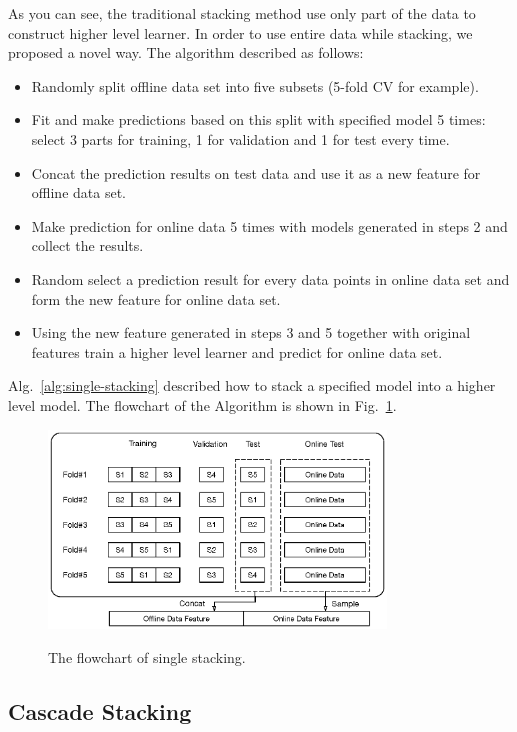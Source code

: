 \documentclass[12pt]{article}
\begin{document}
As you can see, the traditional stacking method use only part of the data to construct higher level learner. In order to use entire data while stacking, we proposed a novel way. The algorithm described as follows:

\begin{itemize}
\label{alg:single-stacking}
\item[1.] Randomly split offline data set into five subsets (5-fold CV for example).
\item[2.] Fit and make predictions based on this split with specified model 5 times: select 3 parts for training, 1 for validation and 1 for test every time.
\item[3.] Concat the prediction results on test data and use it as a new feature for offline data set.
\item[4.] Make prediction for online data 5 times with models generated in steps 2 and collect the results.
\item[5.] Random select a prediction result for every data points in online data set and form the new feature for online data set.
\item[6.] Using the new feature generated in steps 3 and 5 together with original features train a higher level learner and predict for online data set.
\end{itemize}

Alg.~{\ref{alg:single-stacking}} described how to stack a specified model into a higher level model. The flowchart of the Algorithm is shown in Fig.~{\ref{fig:single-stacking}}.


\begin{figure}[ht]
  \centering
  \includegraphics[width=0.8\textwidth]{../img/single-stacking}\\
  \caption{The flowchart of single stacking.}
  \label{fig:single-stacking}
\end{figure}

\subsection{Cascade Stacking}
\end{document}
